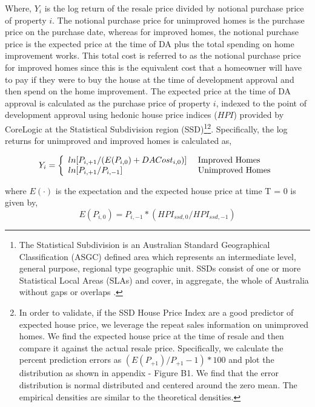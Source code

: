 \documentclass[AEJ,reqno, draftmode]{AEA} %
\begin{document}
Where, $Y_i$ is the log return of the resale price divided by notional purchase price of property $i$. The notional purchase price for unimproved homes is the purchase price on the purchase date, whereas for improved homes, the notional purchase price is the expected price at the time of DA plus the total spending on home improvement works. This total cost is referred to as the notional purchase price for improved homes since this is the equivalent cost that a homeowner will have to pay if they were to buy the house at the time of development approval and then spend on the home improvement. The expected price at the time of DA approval is calculated as the purchase price of property $i$, indexed to the point of development approval using hedonic house price indices ($HPI$) provided by CoreLogic at the Statistical Subdivision region (SSD)\footnote{The Statistical Subdivision is an Australian Standard Geographical Classification (ASGC) defined area which represents an intermediate level, general purpose, regional type geographic unit. SSDs consist of one or more Statistical Local Areas (SLAs) and cover, in aggregate, the whole of Australia without gaps or overlaps \citep{SSD}.}\footnote{In order to validate, if the SSD House Price Index are a good predictor of expected house price, we leverage the repeat sales information on unimproved homes. We find the expected house price at the time of resale and then compare it against the actual resale price. Specifically, we calculate the percent prediction errors as $(E(P_{+1})/P_{+1}-1)*100$ and plot the distribution as shown in appendix - Figure B1. We find that the error distribution is normal distributed and centered around the zero mean. The empirical densities are similar to the theoretical densities.}. Specifically, the log returns for unimproved and improved homes is calculated as,

\begin{equation}
    Y_i = \left\{
    \begin{array}{l l}
      ln[P_{i,+1}/(E(P_{i,0})+ DACost_{i,0})] & \text{ Improved Homes}\\
      ln[P_{i,+1}/P_{i,-1}] & \text{ Unimproved Homes} \\
    \end{array} \right.
\end{equation}

where $E(\cdot)$ is the expectation and the expected house price at time T = 0 is given by, \begin{equation}
    E(P_{i,0}) = P_{i,-1} * (HPI_{ssd,0} / HPI_{ssd,-1})
\end{equation}
\end{document}
